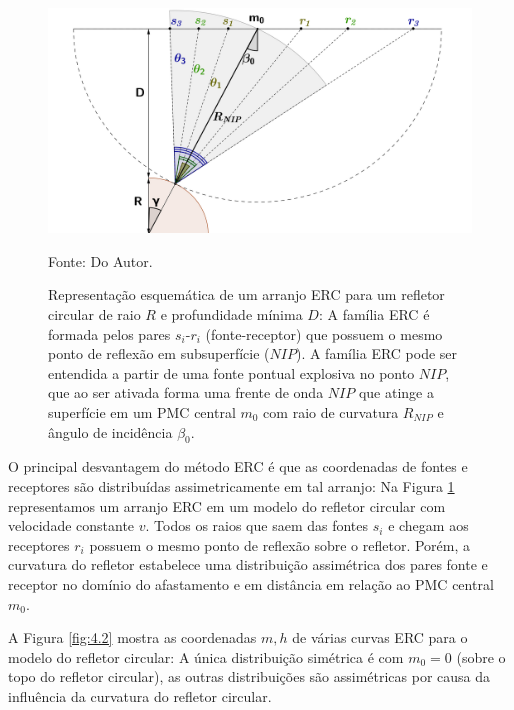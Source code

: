 \begin{figure}[H]
\caption{Representação esquemática de um arranjo ERC para um refletor circular de raio $R$ e profundidade
mínima $D$: A família ERC é formada pelos pares $s_i$-$r_i$ (fonte-receptor) que possuem o mesmo ponto de
reflexão em subsuperfície ($NIP$). A família ERC pode ser entendida a partir de uma fonte pontual explosiva
no ponto $NIP$, que ao ser ativada forma uma frente de onda $NIP$ que atinge a superfície em um PMC central 
$m_0$ com raio de curvatura $R_{NIP}$ e ângulo de incidência $\beta_0$.}
\begin{center}
\includegraphics[scale=0.3]{images/cre.png}
\vspace{-0.3cm}
\end{center}
\begin{center}
 Fonte: Do Autor.
\end{center}
\label{fig:4.1}
\end{figure}

O principal desvantagem do método ERC é que as coordenadas de fontes e receptores são distribuídas assimetricamente em tal 
arranjo: Na Figura \ref{fig:4.1} representamos um arranjo ERC em um modelo do refletor circular com velocidade constante $v$.
Todos os raios que saem das fontes $s_i$ e chegam aos receptores $r_i$ possuem o mesmo ponto de reflexão sobre o refletor.
Porém, a curvatura do refletor estabelece uma distribuição assimétrica dos pares fonte e receptor no domínio do afastamento
e em distância em relação ao PMC central $m_0$.

A Figura \ref{fig:4.2} mostra as coordenadas $m,h$ de várias curvas ERC para o modelo do refletor circular: A única distribuição
simétrica é com $m_0=0$ (sobre o topo do refletor circular), as outras distribuições são assimétricas por causa da influência da
curvatura do refletor circular.

